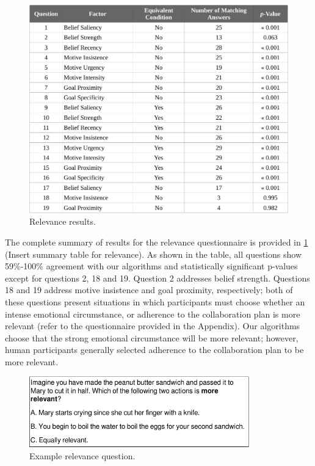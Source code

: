 \documentclass[12pt]{report}
\begin{document}
\begin{figure}[tbh]
  \centering
  \includegraphics[width=1\textwidth]{figure/relevance_result_croped.pdf}
  \caption{Relevance results.}
  \label{fig:relevance_result}
\end{figure}

The complete summary of results for the relevance questionnaire is provided in
\ref{fig:relevance_result} (Insert summary table for relevance). As shown in the
table, all questions show 59\%-100\% agreement with our algorithms and
statistically significant p-values except for questions 2, 18 and 19. Question 2
addresses belief strength. Questions 18 and 19 address motive insistence and
goal proximity, respectively; both of these questions present situations in
which participants must choose whether an intense emotional circumstance, or
adherence to the collaboration plan is more relevant (refer to the questionnaire
provided in the Appendix). Our algorithms choose that the strong emotional
circumstance will be more relevant; however, human participants generally
selected adherence to the collaboration plan to be more relevant.

\begin{figure}[tbh]
  \centering
  \includegraphics[width=0.85\textwidth]{figure/question-sample4-croped.pdf}
  \caption{{Example relevance question.}}
  \label{fig:qs4}
\end{figure}
\end{document}
